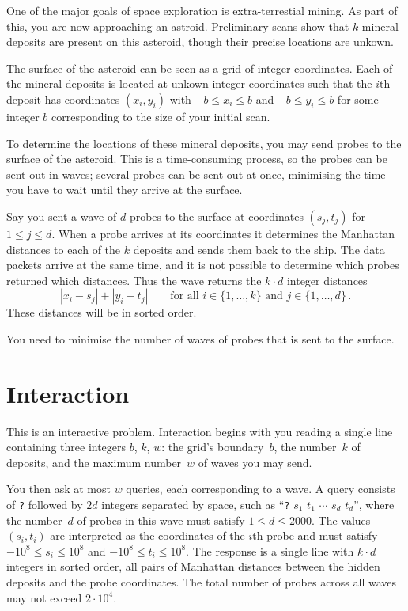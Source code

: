 

\noindent
One of the major goals of space exploration is extra-terrestial mining. 
As part of this, you are now approaching an astroid. 
Preliminary scans show that $k$ mineral deposits are present on this asteroid, though their precise locations are unkown.

\medskip

The surface of the asteroid can be seen as a grid of integer coordinates.
Each of the mineral deposits is located at unkown integer coordinates such that the $i$th deposit has coordinates $(x_i, y_i)$ with  
$-b \le x_i \le b$ and $-b\le y_i \le b$ %
for some integer $b$ corresponding to the size of your initial scan.

To determine the locations of these mineral deposits, you may send probes to the surface of the asteroid. 
This is a time-consuming process, so the probes can be sent out in waves;
several probes can be sent out at once, minimising the time you have to wait until they arrive at the surface.

Say you sent a wave of $d$ probes to the surface at coordinates $(s_j,t_j)$ for $1\leq j\leq d$.
When a probe arrives at its coordinates it determines the Manhattan distances to each of the $k$ deposits and sends them back to the ship. 
The data packets arrive at the same time, and it is not possible to determine which probes returned which distances. 
Thus the wave returns the $k\cdot d$ integer distances
\[|x_i-s_j| + |y_i - t_j| \qquad\text{for all } i \in \{1,\ldots,k\} \text{ and } j \in\{ 1,\ldots,d\}\,.\]
These distances will be in sorted order.

You need to minimise the number of waves of probes that is sent to the surface.


\section*{Interaction}

This is an interactive problem.
Interaction begins with you reading a single line containing three integers $b$, $k$, $w$:
the grid's boundary~$b$,
the number~$k$ of deposits,
and the maximum number~$w$ of waves you may send.

You then ask at most $w$ queries, each corresponding to a wave.
A query consists of \texttt{?} followed by $2d$ integers separated by space, such as ``\texttt{?} $s_1$ $t_1$ $\cdots$ $s_d$ $t_d$'', where the number~$d$ of probes in this wave must satisfy
$1\leq d\leq 2000$. %
The values $(s_i,t_i)$ are interpreted as the coordinates of the $i$th probe and must satisfy
$-10^8 \leq s_i \leq 10^8$ and $-10^8 \leq t_i \leq 10^8$. %
The response is a single line with $k \cdot d$ integers in sorted order, all pairs of Manhattan distances between the hidden deposits and the probe coordinates.
The total number of probes across all waves may not exceed
$2\cdot 10^4.$ %

